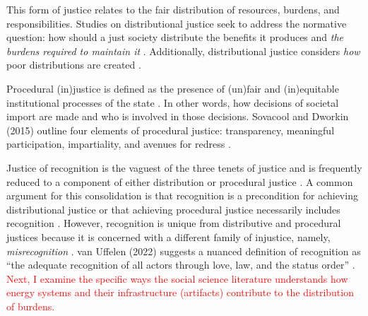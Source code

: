 \noindent\hrulefill

    This form of justice relates to the fair distribution of resources, burdens,
    and responsibilities. Studies on distributional justice seek to address the
    normative question: how should a just society distribute the benefits it
    produces and \textit{the burdens required to maintain it}
    \cite{brighouse_justice_2004}. Additionally, distributional justice
    considers \textit{how} poor distributions are created
    \cite{schlosberg_2_2007}.
    
\noindent\hrulefill

    Procedural (in)justice is defined as the presence of (un)fair and
    (in)equitable institutional processes of the state \cite{schlosberg_2_2007}.
    In other words, how decisions of societal import are made and who is
    involved in those decisions. Sovacool and Dworkin (2015) outline four
    elements of procedural justice: transparency, meaningful participation,
    impartiality, and avenues for redress \cite{sovacool_energy_2015}.
    
\noindent\hrulefill

    Justice of recognition is the vaguest of the three tenets of justice and is
    frequently reduced to a component of either distribution or procedural
    justice \cite{schlosberg_2_2007, van_uffelen_revisiting_2022}. A common
    argument for this consolidation is that recognition is a precondition for
    achieving distributional justice or that achieving procedural justice
    necessarily includes recognition \cite{schlosberg_2_2007}. However,
    recognition is unique from distributive and procedural justices because it
    is concerned with a different family of injustice, namely,
    \textit{misrecognition} \cite{van_uffelen_revisiting_2022}. van Uffelen
    (2022) suggests a nuanced definition of recognition as ``the adequate
    recognition of all actors through love, law, and the status order''
    \cite{van_uffelen_revisiting_2022}.
\textcolor{red}{Next, I examine the specific ways the social science literature understands how energy systems and their infrastructure (artifacts) contribute to the distribution of burdens.}

\noindent\hrulefill

